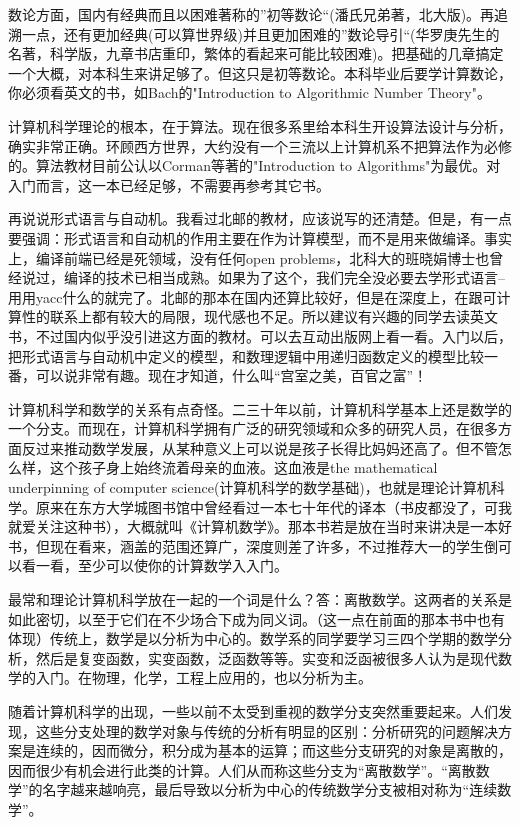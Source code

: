 数论方面，国内有经典而且以困难著称的”初等数论“(潘氏兄弟著，北大版)。再追溯一点，还有更加经典(可以算世界级)并且更加困难的”数论导引“(华罗庚先生的名著，科学版，九章书店重印，繁体的看起来可能比较困难)。把基础的几章搞定一个大概，对本科生来讲足够了。但这只是初等数论。本科毕业后要学计算数论，你必须看英文的书，如Bach的"Introduction to Algorithmic Number Theory"。


计算机科学理论的根本，在于算法。现在很多系里给本科生开设算法设计与分析，确实非常正确。环顾西方世界，大约没有一个三流以上计算机系不把算法作为必修的。算法教材目前公认以Corman等著的"Introduction to Algorithms"为最优。对入门而言，这一本已经足够，不需要再参考其它书。


再说说形式语言与自动机。我看过北邮的教材，应该说写的还清楚。但是，有一点要强调：形式语言和自动机的作用主要在作为计算模型，而不是用来做编译。事实上，编译前端已经是死领域，没有任何open problems，北科大的班晓娟博士也曾经说过，编译的技术已相当成熟。如果为了这个，我们完全没必要去学形式语言--用用yacc什么的就完了。北邮的那本在国内还算比较好，但是在深度上，在跟可计算性的联系上都有较大的局限，现代感也不足。所以建议有兴趣的同学去读英文书，不过国内似乎没引进这方面的教材。可以去互动出版网上看一看。入门以后，把形式语言与自动机中定义的模型，和数理逻辑中用递归函数定义的模型比较一番，可以说非常有趣。现在才知道，什么叫“宫室之美，百官之富”！


计算机科学和数学的关系有点奇怪。二三十年以前，计算机科学基本上还是数学的一个分支。而现在，计算机科学拥有广泛的研究领域和众多的研究人员，在很多方面反过来推动数学发展，从某种意义上可以说是孩子长得比妈妈还高了。但不管怎么样，这个孩子身上始终流着母亲的血液。这血液是the mathematical underpinning of computer science(计算机科学的数学基础)，也就是理论计算机科学。原来在东方大学城图书馆中曾经看过一本七十年代的译本（书皮都没了，可我就爱关注这种书），大概就叫《计算机数学》。那本书若是放在当时来讲决是一本好书，但现在看来，涵盖的范围还算广，深度则差了许多，不过推荐大一的学生倒可以看一看，至少可以使你的计算数学入入门。


最常和理论计算机科学放在一起的一个词是什么？答：离散数学。这两者的关系是如此密切，以至于它们在不少场合下成为同义词。（这一点在前面的那本书中也有体现）传统上，数学是以分析为中心的。数学系的同学要学习三四个学期的数学分析，然后是复变函数，实变函数，泛函数等等。实变和泛函被很多人认为是现代数学的入门。在物理，化学，工程上应用的，也以分析为主。


随着计算机科学的出现，一些以前不太受到重视的数学分支突然重要起来。人们发现，这些分支处理的数学对象与传统的分析有明显的区别：分析研究的问题解决方案是连续的，因而微分，积分成为基本的运算；而这些分支研究的对象是离散的，因而很少有机会进行此类的计算。人们从而称这些分支为“离散数学”。“离散数学”的名字越来越响亮，最后导致以分析为中心的传统数学分支被相对称为“连续数学”。


